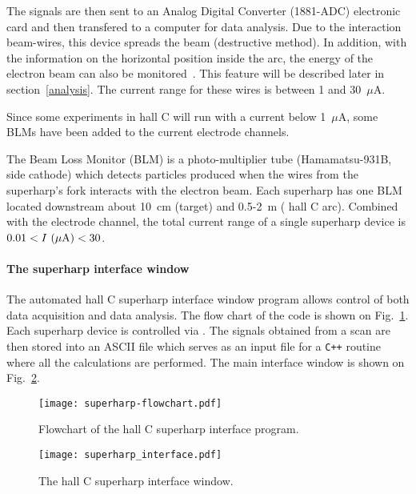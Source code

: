 The signals are then sent to an Analog Digital Converter (1881-ADC) electronic card and then transfered
to a computer for data analysis. Due to the interaction beam-wires, this device spreads the beam
(destructive method). In addition, with the information on the horizontal position inside the arc, the
energy of the electron beam can also be monitored~\cite{Gueye-98-energy}. This feature will be described
later in section~\ref{analysis}. The current range for these wires is
between 1 and 30~$\mu$A.  

Since some experiments in hall C will run with a current below
1~$\mu$A,  some BLMs have been added to the
current electrode channels.

The Beam Loss Monitor (BLM) is a photo-multiplier tube (Hamamatsu-931B, side cathode) which detects
particles produced when the wires from the superharp's fork interacts
with the  electron beam. Each
superharp has one BLM located downstream about 10~cm (target) and
0.5-2~m ( hall C arc). Combined with
the electrode channel, the total current range of a single superharp device is
$0.01 < I~(\mu {\rm A}) < 30$.

\paragraph{The superharp interface window}\label{interface}

The automated hall C superharp interface window program allows control of both
data acquisition and data analysis. The flow chart of the code is shown on Fig.~\ref{figure:flow_chart}. 
Each superharp device is controlled via 
. The
signals obtained from a scan are then
stored into an ASCII file which serves as an input file for a {\tt C++} routine where all the
calculations are performed. The main interface window is shown on Fig.~\ref{figure:interface}.

\begin{figure}[!hbt]
\begin{center}
\texttt{[image: superharp-flowchart.pdf]}
\caption{Flowchart of the hall C superharp interface program.}\label{figure:flow_chart}
\end{center}
\end{figure}

\begin{figure}[!hbt]
\begin{center}
\texttt{[image: superharp\_interface.pdf]}
\caption{The hall C superharp interface window.}\label{figure:interface}
\end{center}
\end{figure}


